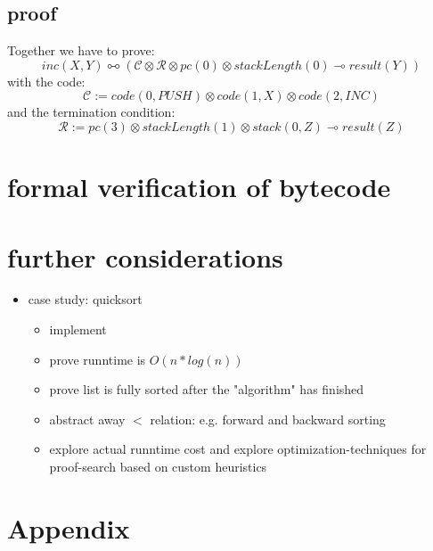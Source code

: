 \documentclass[sigconf]{acmart}
\begin{document}
\subsection*{proof}

Together we have to prove:
\[ inc(X,Y) \multimapboth (\mathcal{C}\otimes \mathcal{R}\otimes pc(0)\otimes stackLength(0) \multimap result(Y)) \]
with the code:
\[ \mathcal{C} := code(0, PUSH)\otimes code(1, X) \otimes code(2, INC) \]
and the termination condition:
\[ \mathcal{R} := pc(3)\otimes stackLength(1) \otimes stack(0, Z)\multimap result(Z)\]




\section{formal verification of bytecode}


\section{further considerations}

\begin{itemize}
  \item case study: quicksort
  \begin{itemize}
    \item implement
    \item prove runntime is $O(n*log(n))$
    \item prove list is fully sorted after the "algorithm" has finished
    \item abstract away $<$ relation: e.g. forward and backward sorting
    \item explore actual runntime cost and explore optimization-techniques for proof-search based on custom heuristics
  \end{itemize}
\end{itemize}



\section{Appendix}
\end{document}
